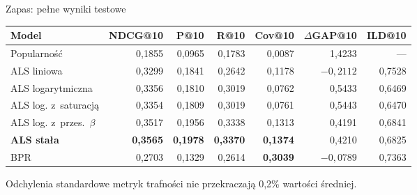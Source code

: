\documentclass[aspectratio=169,11pt]{beamer}
\makeatletter
\newcommand{\ndcg}{NDCG@10}
\makeatother
\begin{document}
\begin{frame}{Zapas: pełne wyniki testowe}
  \centering\scriptsize
  \begin{tabular}{lrrrrrr}
    \toprule
    Model & \ndcg{} & P@10 & R@10 & Cov@10 & $\Delta$GAP@10 & ILD@10 \\
    \midrule
    Popularność & 0,1855 & 0,0965 & 0,1783 & 0,0087 & 1,4233 & --- \\
    ALS liniowa & 0,3299 & 0,1841 & 0,2642 & 0,1178 & $-0{,}2112$ & 0,7528 \\
    ALS logarytmiczna & 0,3356 & 0,1810 & 0,3019 & 0,0762 & 0,5433 & 0,6469 \\
    ALS log. z~saturacją & 0,3354 & 0,1809 & 0,3019 & 0,0761 & 0,5443 & 0,6470 \\
    ALS log. z~przes.~$\beta$ & 0,3517 & 0,1956 & 0,3338 & 0,1313 & 0,4191 & 0,6841 \\
    \textbf{ALS stała} & \textbf{0,3565} & \textbf{0,1978} & \textbf{0,3370} & \textbf{0,1374} & 0,4210 & 0,6825 \\
    BPR & 0,2703 & 0,1329 & 0,2614 & \textbf{0,3039} & $-0{,}0789$ & 0,7363 \\
    \bottomrule
  \end{tabular}

  \vspace{1em}
  \small Odchylenia standardowe metryk trafności nie przekraczają 0,2\% wartości średniej.
\end{frame}
\end{document}
